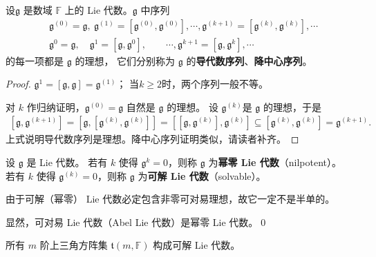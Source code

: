 \begin{proposition}
    设$\mathfrak{g}$ 是数域 $\mathbb{F}$ 上的 Lie 代数。$\mathfrak{g}$ 中序列
    \begin{align*}
    &\mathfrak{g}^{(0)}=\mathfrak{g}, \
    \mathfrak{g}^{(1)}=\left[\mathfrak{g}^{(0)}, \mathfrak{g}^{(0)}\right],\cdots,
    \mathfrak{g}^{(k+1)}=\left[\mathfrak{g}^{(k)}, \mathfrak{g}^{(k)}\right],\cdots \\
    &\mathfrak{g}^0=\mathfrak{g}, \quad
    \mathfrak{g}^{1}=\left[\mathfrak{g}, \mathfrak{g}^{0}\right],  \qquad  \cdots,
    \mathfrak{g}^{k+1}=\left[\mathfrak{g}, \mathfrak{g}^k\right], \cdots
    \end{align*}
    的每一项都是 $\mathfrak{g}$ 的理想，
    它们分别称为 $\mathfrak{g}$ 的\textbf{导代数序列}、\textbf{降中心序列}。
\end{proposition}
\begin{proof}
    $\mathfrak{g}^{1}=\left[\mathfrak{g}, \mathfrak{g}\right]=\mathfrak{g}^{(1)}$；
    当$k\geqslant 2$时，两个序列一般不等。

    对 $k$ 作归纳证明，$\mathfrak{g}^{(0)}=\mathfrak{g}$ 自然是 $\mathfrak{g}$ 的理想。
    设 $\mathfrak{g}^{(k)}$是 $\mathfrak{g}$ 的理想，于是
    \begin{align*}
        \left[\mathfrak{g}, \mathfrak{g}^{(k+1)}\right]=\left[\mathfrak{g},\left[\mathfrak{g}^{(k)}, \mathfrak{g}^{(k)}\right]\right]=\left[\left[\mathfrak{g}, \mathfrak{g}^{(k)}\right], \mathfrak{g}^{(k)}\right] \subseteq\left[\mathfrak{g}^{(k)}, \mathfrak{g}^{(k)}\right]=\mathfrak{g}^{(k+1)} .
    \end{align*}
    上式说明导代数序列是理想。降中心序列证明类似，请读者补齐。
\end{proof}

\begin{definition}
设 $\mathfrak{g}$ 是 Lie 代数。
若有 $k$ 使得 $\mathfrak{g}^k=0$，则称 $\mathfrak{g}$ 为\textbf{幂零 Lie 代数}（nilpotent）。
若有 $k$ 使得 $\mathfrak{g}^{(k)}=0$，则称 $\mathfrak{g}$ 为\textbf{可解 Lie 代数}（solvable）。
\end{definition}

由于可解（幂零） Lie 代数必定包含非零可对易理想，故它一定不是半单的。

\begin{example}
显然，可对易 Lie 代数（Abel Lie 代数）是幂零 Lie 代数。\qed
\end{example}

\begin{example}
    所有 $m$ 阶上三角方阵集 $\mathfrak{t}(m, \mathbb{F})$ 构成可解 Lie 代数。
\end{example}

